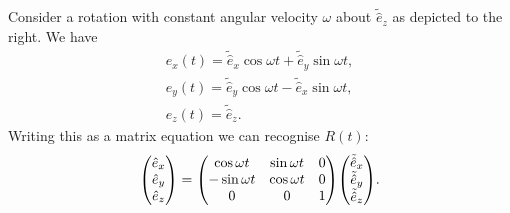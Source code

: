 \documentclass{article}
\begin{document}
\vspace{-0.5cm}
\begin{example}
	Consider a rotation with constant angular velocity $ \omega $ about $\tilde{\hat{e}}_z$ as depicted to the right. We have
	\begin{gather*}
		\hat{e}_{x}(t) = \tilde{\hat{e}}_{x}  \cos\omega t + \tilde{\hat{e}}_{y} \sin \omega t , \\
		\hat{e}_{y}(t) = \tilde{\hat{e}}_{y}  \cos\omega t - \tilde{\hat{e}}_{x} \sin \omega t , \\
		\hat{e}_{z}(t) = \tilde{\hat{e}}_{z}.
	\end{gather*}
	Writing this as a matrix equation we can recognise $ R(t) $:
	\[
		\mqty(\hat{e}_{x} \\ \hat{e}_{y} \\ \hat{e}_{z}) = \mqty(\cos \omega t & \sin \omega t & 0 \\ -\sin \omega t & \cos \omega t & 0 \\ 0 & 0 & 1) \mqty(\tilde{\hat{e}}_{x} \\ \tilde{\hat{e}}_{y} \\ \tilde{\hat{e}}_{z}).
	\]
\end{example}
\end{document}
